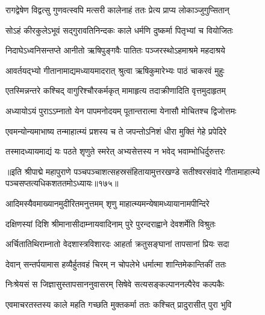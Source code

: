 \twolineshloka
{रागद्वेषेण विद्वत्सु गुणवत्स्वपि मत्सरी}
{कालेनाहं ततः प्रेत्य प्राप्य लोकाञ्जुगुप्सितान्} %

\twolineshloka
{सोऽहं कीरकुलेऽभूवं सद्गुरावतिनिन्दकः}
{काले धर्मणि दुष्कर्मा पितृभ्यां च वियोजितः} %

\twolineshloka
{निदाघेऽध्वनिसन्तप्ते आनीतो ऋषिपुङ्गवैः}
{पातितः पञ्जरस्थोऽहमाश्रमे महदाश्रये} %

\twolineshloka
{आवर्तयद्भ्यो गीतानामाद्यमध्यायमादरात्}
{श्रुत्वा ऋषिकुमारेभ्यः पाठं चाकरवं मुहुः} %

\twolineshloka
{एतस्मिन्नन्तरे कश्चिद् वागुरिश्चौरकर्मकृत्}
{मामाहृत्य तदाक्रीणादिति वृत्तमुदाहृतम्} %


\twolineshloka
{अध्यायोऽयं पुराऽऽम्नातो येन पापमनोदयम्}
{पूतान्तरात्मा येनासौ मोचितश्च द्विजोत्तमः} %

\twolineshloka
{एवमन्योन्यमाभाष्य तन्माहात्म्यं प्रशस्य च}
{ते जपन्तोऽनिशं धीरा मुक्तिं गेहे प्रपेदिरे} %

\twolineshloka
{तस्मादध्यायमाद्यं यः पठते शृणुते स्मरेत्}
{अभ्यसेत्तस्य न भवेद् भवाम्भोधिर्दुरुत्तरः} %

॥इति श्रीपाद्मे महापुराणे पञ्चपञ्चाशत्सहस्रसंहितायामुत्तरखण्डे सतीश्वरसंवादे गीतामाहात्म्ये पञ्चसप्तत्यधिकशततमोऽध्यायः॥१७५॥

\genMangalaShloka

\closesub

\ganapatyadiDhyanam
\padmaPuranam



\twolineshloka
{आदिमस्यैवमाख्यानमुदीरितमनुत्तमम्}
{शृणु माहात्म्यमन्येषामध्यायानामपीन्दिरे} %

\twolineshloka
{दक्षिणस्यां दिशि श्रीमानासीदाम्नायवादिनाम्}
{पुरे पुरन्दराह्वाने देवशर्मेति विश्रुतः} %

\twolineshloka
{अर्चितातिथिराम्नातो वेदशास्त्रविशारदः}
{आहर्ता क्रतुसङ्घानां तापसानां प्रियः सदा} %

\twolineshloka
{देवान् सन्तर्पयामास हव्यैर्हुतवहं चिरम्}
{न चोपलेभे धर्मात्मा शान्तिमेकान्तिकीं ततः} %

\twolineshloka
{निःश्रेयसं स जिज्ञासुस्तापसाननुवासरम्}
{सिषेवे सत्यसङ्कल्पाननल्पैरेव कल्पकैः} %

\twolineshloka
{एवमाचरतस्तस्य काले महति गच्छति}
{मुक्तकर्मा ततः कश्चित् प्रादुरासीत् पुरा भुवि} %

